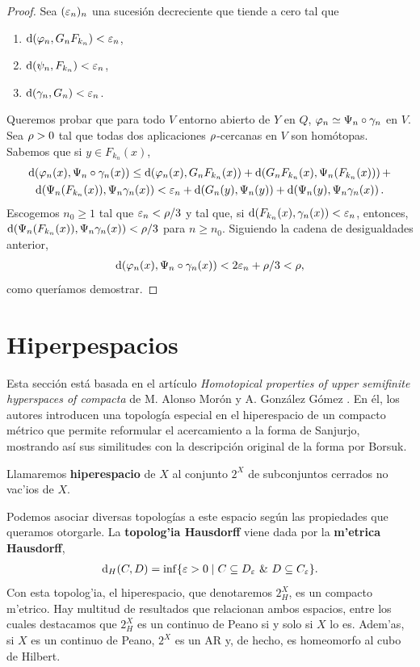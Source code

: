 \begin{proof}
  Sea $ (\varepsilon_n)_n  $ una sucesión decreciente que tiende a cero tal que 
  \begin{enumerate}
    \item $ \dd(\varphi_n,G_nF_{k_n})<\varepsilon_n  $,
    \item $ \dd(\psi_n,F_{k_n})<\varepsilon_n  $, 
    \item $ \dd(\gamma_n,G_n)<\varepsilon_n  $.
  \end{enumerate}
  Queremos probar que para todo $ V   $ entorno abierto de $ Y  $ en $ Q  $, $ \varphi_n\simeq \Psi_n\circ \gamma_n  $ en $ V  $. Sea $ \rho>0  $ tal que todas dos aplicaciones $ \rho $-cercanas en $ V  $ son homótopas. Sabemos que si $ y\in F_{k_n}(x) $,
  \begin{gather*}
    \dd(\varphi_n(x),\Psi_n \circ \gamma_n(x))\leq \dd(\varphi_n(x),G_nF_{k_n}(x)) + \dd (G_nF_{k_n}(x),\Psi_n(F_{k_n}(x)))+\\ 
    \dd(\Psi_n(F_{k_n}(x)),\Psi_n\gamma_n(x))<\varepsilon_n +  \dd(G_n(y),\Psi_n(y)) +\dd(\Psi_n(y),\Psi_n\gamma_n(x)).
  \end{gather*}
  Escogemos $ n_0\geq 1 $ tal que $ \varepsilon_n <\rho/3 $ y tal que, si $ \dd(F_{k_n}(x),\gamma_n (x) ) <\varepsilon_n $, entonces, $ \dd(\Psi_n(F_{k_n}(x)),\Psi_n\gamma_n(x))<\rho/3 $ para $ n\geq n_0 $. Siguiendo la cadena de desigualdades anterior, 
  \begin{gather*}
    \dd(\varphi_n(x),\Psi_n \circ \gamma_n(x))<2\varepsilon_n +\rho/3<\rho,
  \end{gather*}
  como queríamos demostrar.
\end{proof}

\section{Hiperpespacios}
Esta sección está basada en el artículo \textit{Homotopical properties of upper semifinite hyperspaces of compacta} de M. Alonso Morón y A. González Gómez \cite{ALONSOMORON2008972}. En él, los autores introducen una topología especial en el hiperespacio de un compacto métrico que permite reformular el acercamiento a la forma de Sanjurjo, mostrando así sus similitudes con la descripción original de la forma por Borsuk.

\begin{definition}
  Llamaremos \textbf{hiperespacio} de $ X  $ al conjunto $2^X$ de subconjuntos cerrados no vac'ios de $ X  $.
\end{definition}
Podemos asociar diversas topologías a este espacio según las propiedades que queramos otorgarle. La \textbf{topolog'ia Hausdorff} viene dada por la \textbf{m'etrica Hausdorff}, 
\begin{gather*}
    \dd_H(C,D) = \inf\{\varepsilon>0\mid C\subseteq D_\varepsilon \ \& \ D\subseteq C_\varepsilon\}.
\end{gather*}
Con esta topolog'ia, el hiperespacio, que denotaremos $2^X_H$, es un compacto m'etrico. Hay multitud de resultados que relacionan ambos espacios, entre los cuales destacamos que $2^X_H$ es un continuo de Peano si y solo si $X$ lo es. Adem'as, si $X$ es un continuo de Peano, $2^X$ es un AR y, de hecho, es homeomorfo al cubo de Hilbert.

